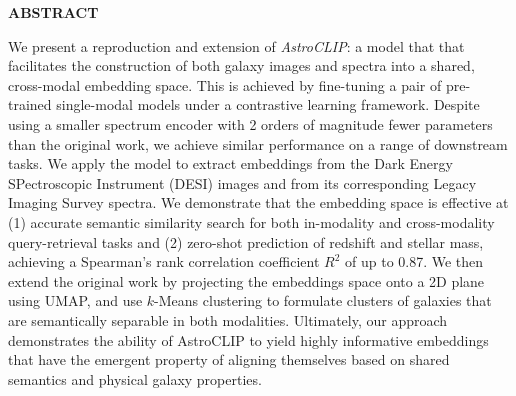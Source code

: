 \documentclass[draft, a4paper,12pt]{article}
\begin{document}
    \newpage
    \begin{center}
        \textbf{ABSTRACT}
    \end{center}
    We present a reproduction and extension of \emph{AstroCLIP}: a model that that facilitates the construction of both galaxy images and spectra into a shared, cross-modal embedding space. This is achieved by fine-tuning a pair of pre-trained single-modal models under a contrastive learning framework. Despite using a smaller spectrum encoder with 2 orders of magnitude fewer parameters than the original work, we achieve similar performance on a range of downstream tasks. We apply the model to extract embeddings from the Dark Energy SPectroscopic Instrument (DESI) images and from its corresponding Legacy Imaging Survey spectra. We demonstrate that the embedding space is effective at (1) accurate semantic similarity search for both in-modality and cross-modality query-retrieval tasks and (2) zero-shot prediction of redshift and stellar mass, achieving a Spearman's rank correlation coefficient $R^2$ of up to 0.87. We then extend the original work by projecting the embeddings space onto a 2D plane using UMAP, and use $k$-Means clustering to formulate clusters of galaxies that are semantically separable in both modalities. Ultimately, our approach demonstrates the ability of AstroCLIP to yield highly informative embeddings that have the emergent property of aligning themselves based on shared semantics and physical galaxy properties.



    \newpage
    
    \tableofcontents
    
    \newpage





\end{document}
